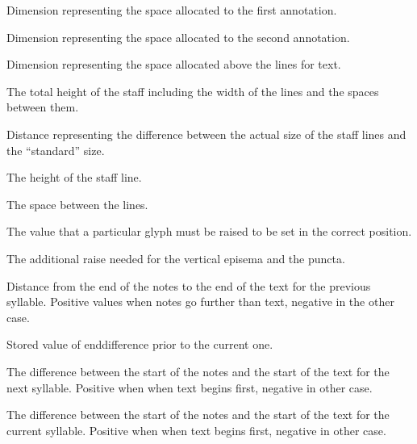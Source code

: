 Dimension representing the space allocated to the first annotation.

Dimension representing the space allocated to the second annotation.

Dimension representing the space allocated above the lines for text.	

The total height of the staff including the width of the lines and the spaces between them.

Distance representing the difference between the actual size of the staff lines and the ``standard'' size.

The height of the staff line.

The space between the lines.

The value that a particular glyph must be raised to be set in the correct position.

The additional raise needed for the vertical episema and the puncta.

Distance from the end of the notes to the end of the text for the previous syllable.  Positive values when notes go further than text, negative in the other case.

Stored value of enddifference prior to the current one.

The difference between the start of the notes and the start of the text for the next syllable.  Positive when when text begins first, negative in other case.

The difference between the start of the notes and the start of the text for the current syllable.  Positive when when text begins first, negative in other case.


